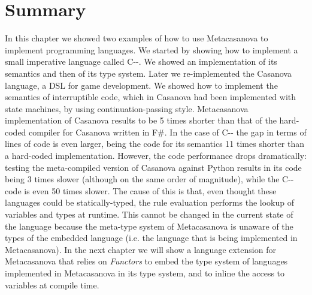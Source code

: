 \section{Summary}
In this chapter we showed two examples of how to use Metacasanova to implement programming languages. We started by showing how to implement a small imperative language called C-{}-. We showed an implementation of its semantics and then of its type system. Later we re-implemented the Casanova language, a DSL for game development. We showed how to implement the semantics of interruptible code, which in Casanova had been implemented with state machines, by using continuation-passing style. Metacasanova implementation of Casanova results to be 5 times shorter than that of the hard-coded compiler for Casanova written in F\#. In the case of C-{}- the gap in terms of lines of code is even larger, being the code for its semantics 11 times shorter than a hard-coded implementation. However, the code performance drops dramatically: testing the meta-compiled version of Casanova against Python results in its code being 3 times slower (although on the same order of magnitude), while the C-{}- code is even 50 times slower. The cause of this is that, even thought these languages could be statically-typed, the rule evaluation performs the lookup of variables and types at runtime. This cannot be changed in the current state of the language because the meta-type system of Metacasanova is unaware of the types of the embedded language (i.e. the language that is being implemented in Metacasanova). In the next chapter we will show a language extension for Metacasanova that relies on \textit{Functors} to embed the type system of languages implemented in Metacasanova in its type system, and to inline the access to variables at compile time.
